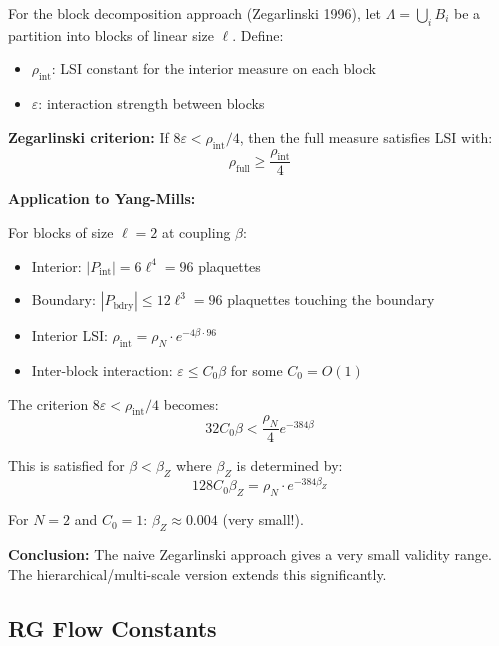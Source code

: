 \begin{theorem}
\label{thm:zegarlinski-constants-app81}
For the block decomposition approach (Zegarlinski 1996), let $\Lambda = \bigcup_i B_i$ 
be a partition into blocks of linear size $\ell$. Define:
\begin{itemize}
\item $\rho_{\text{int}}$: LSI constant for the interior measure on each block
\item $\varepsilon$: interaction strength between blocks
\end{itemize}

\textbf{Zegarlinski criterion:} If $8\varepsilon < \rho_{\text{int}}/4$, then the 
full measure satisfies LSI with:
\[
\rho_{\text{full}} \geq \frac{\rho_{\text{int}}}{4}
\]

\textbf{Application to Yang-Mills:}

For blocks of size $\ell = 2$ at coupling $\beta$:
\begin{itemize}
\item Interior: $|P_{\text{int}}| = 6\ell^4 = 96$ plaquettes
\item Boundary: $|P_{\text{bdry}}| \leq 12\ell^3 = 96$ plaquettes touching the boundary
\item Interior LSI: $\rho_{\text{int}} = \rho_N \cdot e^{-4\beta \cdot 96}$
\item Inter-block interaction: $\varepsilon \leq C_0 \beta$ for some $C_0 = O(1)$
\end{itemize}

The criterion $8\varepsilon < \rho_{\text{int}}/4$ becomes:
\[
32 C_0 \beta < \frac{\rho_N}{4} e^{-384\beta}
\]

This is satisfied for $\beta < \beta_Z$ where $\beta_Z$ is determined by:
\[
128 C_0 \beta_Z = \rho_N \cdot e^{-384\beta_Z}
\]

For $N = 2$ and $C_0 = 1$: $\beta_Z \approx 0.004$ (very small!).

\textbf{Conclusion:} The naive Zegarlinski approach gives a very small validity 
range. The hierarchical/multi-scale version extends this significantly.
\end{theorem}

\subsection{RG Flow Constants}


